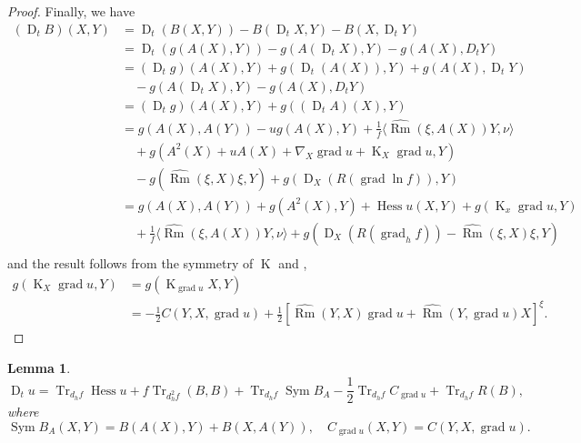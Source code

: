 \documentclass{amsart}
\newtheorem{lemma}[theorem]{Lemma}
\theoremstyle{definition}
\theoremstyle{remark}
\newcommand{\ip}[2]{\ensuremath{\langle{#1},{#2}\rangle}}
\DeclareMathOperator{\grad}{grad}
\DeclareMathOperator{\Rm}{Rm}
\DeclareMathOperator{\Tr}{Tr}
\DeclareMathOperator{\hess}{Hess}
\DeclareMathOperator{\diff}{K}
\DeclareMathOperator{\D}{D}
\DeclareMathOperator{\sym}{Sym}
\numberwithin{equation}{section}
\begin{document}
\begin{proof}
Finally, we have
\[
\begin{split}
(\D_t B) (X, Y) &= \D_t (B(X, Y)) - B(\D_t X, Y) - B(X, \D_t Y) \\
&= \D_t (g(A(X), Y)) - g(A(\D_tX), Y) - g(A(X), D_t Y) \\
&= (\D_t g)(A(X), Y) + g(\D_t(A(X)), Y) + g(A(X), \D_t Y) \\
&\quad - g(A(\D_tX), Y) - g(A(X), D_t Y) \\
&= (\D_t g)(A(X), Y) + g((\D_t A)(X), Y) \\
&= g(A(X), A(Y)) - u g(A(X), Y) + \frac{1}{f} \ip{\hat{\Rm} (\xi, A(X))Y}{\nu} \\
&\quad + g(A^2(X) + u A(X) + \nabla_X \grad u + \diff_X \grad u, Y) \\
&\quad - g(\widehat{\Rm}(\xi, X)\xi, Y) + g(\D_X (R(\grad \ln f)), Y) \\
&= g(A(X), A(Y)) + g(A^2(X), Y) + \hess u (X, Y) + g(\diff_x \grad u, Y) \\
&\quad +\frac{1}{f} \ip{\hat{\Rm} (\xi, A(X))Y}{\nu} + g(\D_X (R(\grad_h f)) - \widehat{\Rm}(\xi, X)\xi, Y) \\
\end{split}
\]
and the result follows from the symmetry of $\diff$ and ,
\[
\begin{split}
g(\diff_X \grad u, Y) &= g(\diff_{\grad u} X, Y) \\
&= -\frac{1}{2} C(Y, X, \grad u) + \frac{1}{2} \left[\widehat{\Rm} (Y, X)\grad u +  \widehat{\Rm} (Y, \grad u) X\right]^{\xi}.
\end{split}
\]
\end{proof}

\begin{lemma}
\label{lem:dtu}
\[
\D_t u = \Tr_{d_hf} \hess u + f\Tr_{d_h^2 f} (B, B) + \Tr_{d_h f} \sym B_A - \frac{1}{2} \Tr_{d_hf} C_{\grad u} + \Tr_{d_h f} R(B),
\]
where
\[
\sym B_A (X, Y) = B(A(X), Y) + B(X, A(Y)), \quad C_{\grad u} (X, Y) = C(Y, X, \grad u).
\]
\end{lemma}
\end{document}

